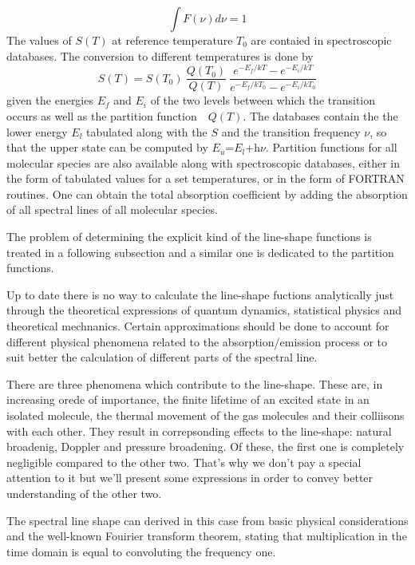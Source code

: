 \begin{equation}
  \int F(\nu)d\nu=1
\label{}
\end{equation}
The values of $S(T)$ at reference temperature $T_0$ are contaied in spectroscopic databases. The conversion to different
temperatures is done by
\begin{equation}
S(T)=S(T_0)~\frac{Q(T_0)}{Q(T)}~\frac{e^{-E_f/kT} - e^{-E_i/kT}}{e^{-E_f/kT_0} - e^{-E_i/kT_0}}
\label{}
\end{equation}
given the energies $E_f$ and $E_i$ of the two levels between which the
transition occurs as well as the partition function~~$Q(T)$. The
databases contain the the lower energy $E_l$ tabulated along with the
$S$ and the transition frequency $\nu$, so that the upper state can be
computed by $E_u$=$E_l$+h$\nu$. Partition functions for all molecular species are also
available along with spectroscopic databases, either in the form of tabulated values for a set
temperatures, or in the form of FORTRAN routines. One can obtain the total absorption
coefficient by adding the absorption of all spectral lines of all
molecular species.

The problem of determining the explicit kind of the line-shape
functions is treated in a following subsection and a similar one is
dedicated to the partition functions.


Up to date there is no way to calculate the line-shape fuctions
analytically just through the theoretical expressions of quantum dynamics,
statistical physics and theoretical mechnanics. Certain approximations
should be done to account for different physical phenomena related to
the absorption/emission process or to suit better the calculation of
different parts of the spectral line.

There are three phenomena which contribute to the line-shape. These
are, in increasing orede of importance, the finite lifetime of an
excited state in an isolated molecule, the thermal movement of the gas
molecules and their colliisons with each other. They result in
correpsonding effects to the line-shape: natural broadenig, Doppler
and pressure broadening. Of these, the first one is completely
negligible compared to the other two. That's why we don't pay a special
attention to it but we'll present some expressions in order to convey
better understanding of the other two.

The spectral line shape can derived in this case from basic physical
considerations and the well-known Fouirier transform theorem, stating
that  multiplication in the time domain is equal to convoluting the
frequency one.

